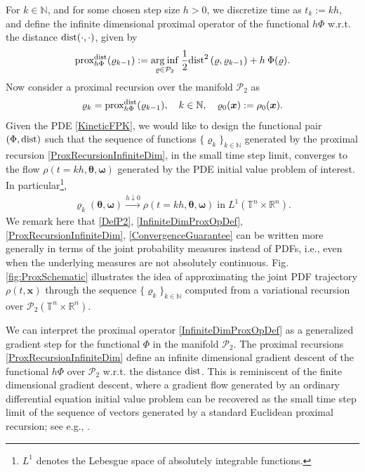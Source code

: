 \documentclass[10pt,twocolumn]{IEEEtran}
\begin{document}
For $k\in\mathbb{N}$, and for some chosen step size $h>0$, we discretize time as $t_{k} := kh$, and define the infinite dimensional proximal operator of the functional $h\Phi$ w.r.t. the distance ${\rm{dist}}(\cdot,\cdot)$, given by
\begin{eqnarray}
{\text{prox}}^{{\rm{dist}}}_{h\Phi}(\varrho_{k-1}) := \underset{\varrho\in\mathcal{P}_{2}} {{\rm{arg\:inf}}}\: \frac{1}{2} {\rm{dist}}^{2}\left(\varrho,\varrho_{k-1}\right) + h\: \Phi(\varrho).
\label{InfiniteDimProxOpDef}
\end{eqnarray}
Now consider a proximal recursion over the manifold $\mathcal{P}_{2}$ as
\begin{eqnarray}
\varrho_{k} = {\text{prox}}^{{\rm{dist}}}_{h\Phi}(\varrho_{k-1}), \quad k\in\mathbb{N}, \quad \varrho_{0}(\bm{x}) := \rho_{0}(\bm{x}).
\label{ProxRecursionInfiniteDim}	
\end{eqnarray}
Given the PDE \eqref{KineticFPK}, we would like to design the functional pair $\left(\Phi,{\rm{dist}}\right)$ such that the sequence of functions $\{\varrho_{k}\}_{k\in\mathbb{N}}$ generated by the proximal recursion \eqref{ProxRecursionInfiniteDim}, in the small time step limit, converges to the flow $\rho(t=kh,\bm{\theta},\bm{\omega})$ generated by the PDE initial value problem of interest. In particular\footnote{$L^{1}$ denotes the Lebesgue space of absolutely integrable functions.},
\begin{align}
\varrho_{k}(\bm{\theta},\bm{\omega}) \xrightarrow{h\downarrow 0} \rho(t=kh,\bm{\theta},\bm{\omega}) \;\text{in}\;L^{1}\left(\mathbb{T}^{n} \times \mathbb{R}^{n}\right).
\label{ConvergenceGuarantee}	
\end{align}
We remark here that \eqref{DefP2}, \eqref{InfiniteDimProxOpDef}, \eqref{ProxRecursionInfiniteDim}, \eqref{ConvergenceGuarantee} can be written more generally in terms of the joint probability measures instead of PDFs, i.e., even when the underlying measures are not absolutely continuous. Fig. \ref{fig:ProxSchematic} illustrates the idea of approximating the joint PDF trajectory $\rho(t,\bm{x})$ through the sequence $\{\varrho_{k}\}_{k\in\mathbb{N}}$ computed from a variational recursion over $\mathcal{P}_{2}\left(\mathbb{T}^{n}\times\mathbb{R}^{n}\right)$.

We can interpret the proximal operator \eqref{InfiniteDimProxOpDef} as a generalized gradient step for the functional $\Phi$ in the manifold $\mathcal{P}_{2}$. The proximal recursions \eqref{ProxRecursionInfiniteDim} define an infinite dimensional gradient descent of the functional $h\Phi$ over $\mathcal{P}_{2}$ w.r.t. the distance ${\rm{dist}}$. This is reminiscent of the finite dimensional gradient descent, where a gradient flow generated by an ordinary differential equation initial value problem can be recovered as the small time step limit of the sequence of vectors generated by a standard Euclidean proximal recursion; see e.g., \cite[Sec. I]{caluya2019TAC}.
\end{document}
